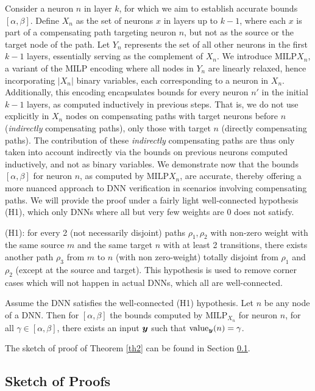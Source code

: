 Consider a neuron $n$ in layer $k$, for which we aim to establish accurate bounds $[\alpha,\beta]$. Define $X_n$ as the set of neurons $x$ in layers up to $k-1$, where each $x$ is part of a compensating path targeting neuron $n$, but not as the source or the target node of the path. Let $Y_n$ represents the set of all other neurons in the first $k-1$ layers, essentially serving as the complement of $X_n$. We introduce MILP${X_n}$, a variant of the MILP encoding where all nodes in $Y_n$ are linearly relaxed, hence incorporating $|X_n|$ binary variables, each corresponding to a neuron in $X_n$. Additionally, this encoding encapsulates bounds for every neuron $n'$ in the initial $k-1$ layers, as computed inductively in previous steps. That is, we do not use explicitly in $X_n$ nodes on compensating paths with target neurons before $n$ ({\em indirectly} compensating paths), 
only those with target $n$ ({directly} compensating paths).
The contribution of these {\em indirectly} compensating paths are thus 
only taken into account indirectly via the bounds on previous neurons computed inductively,
and not as binary variables. We demonstrate now that the bounds $[\alpha,\beta]$ for neuron $n$, as computed by MILP${X_n}$, are accurate, thereby offering a more nuanced approach to DNN verification in scenarios involving compensating paths.
We will provide the proof under a fairly light well-connected hypothesis (H1), which only DNNs where all but very few weights are 0 does not satisfy.

(H1): for every 2 (not necessarily disjoint) paths $\rho_1,\rho_2$ with non-zero weight with the same source $m$ and the same target $n$ with at least 2 transitions, there exists another path $\rho_3$ from $m$ to $n$ (with non zero-weight) totally disjoint from $\rho_1$ and $\rho_2$ (except at the source and target). This hypothesis is used to remove corner cases which will not happen in actual DNNs, which all are well-connected.


\begin{theorem}
	\label{th2} 
	Assume the DNN satisfies the well-connected (H1) hypothesis.
	Let $n$ be any node of a DNN. Then for $[\alpha,\beta]$ the bounds computed by MILP$_{X_n}$ for neuron $n$, for all $\gamma \in [\alpha,\beta]$, there exists an input $\boldsymbol{y}$ such that ${\textrm{value}}_{\boldsymbol{y}}(n)=\gamma$.
\end{theorem}

The sketch of proof of Theorem \ref{th2} can be found in Section \ref{sec.proofs}.


\subsection{Sketch of Proofs}
\label{sec.proofs}


